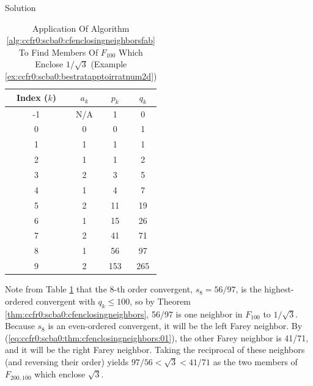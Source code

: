 \begin{vworkexampleparsection}{Solution}
\begin{table}
\caption{Application Of Algorithm \ref{alg:ccfr0:scba0:cfenclosingneighborsfab}
         To Find Members Of $F_{100}$ Which Enclose $1/\sqrt{3}$ 
		 (Example \ref{ex:ccfr0:scba0:bestratapptoirratnum2d})}
\label{tbl:ex:ccfr0:scba0:bestratapptoirratnum2d}
\begin{center}
\begin{tabular}{|c|c|c|c|}
\hline
\hspace{0.15in}\small{Index ($k$)}\hspace{0.15in} & \hspace{0.15in}\small{$a_k$}\hspace{0.15in}   &
 \hspace{0.15in}\small{$p_k$}\hspace{0.15in}    & \hspace{0.15in}\small{$q_k$}\hspace{0.15in}  \\
\hline
\hline
\small{-1}    & \small{N/A}     & \small{1}        & \small{0}      \\
\hline
\small{0}     & \small{0}       & \small{0}        & \small{1}      \\
\hline
\small{1}     & \small{1}       & \small{1}        & \small{1}      \\ 
\hline
\small{2}     & \small{1}       & \small{1}        & \small{2}      \\ 
\hline
\small{3}     & \small{2}       & \small{3}        & \small{5}      \\
\hline
\small{4}     & \small{1}       & \small{4}        & \small{7}      \\
\hline
\small{5}     & \small{2}       & \small{11}       & \small{19}     \\
\hline
\small{6}     & \small{1}       & \small{15}       & \small{26}     \\
\hline
\small{7}     & \small{2}       & \small{41}       & \small{71}     \\
\hline
\small{8}     & \small{1}       & \small{56}       & \small{97}     \\
\hline
\small{9}     & \small{2}       & \small{153}      & \small{265}    \\
\hline
\end{tabular}
\end{center}
\end{table}

Note from Table \ref{tbl:ex:ccfr0:scba0:bestratapptoirratnum2d}
that the 8-th order convergent, $s_8 = 56/97$,
is the highest-ordered convergent with $q_k \leq 100$, so 
by Theorem \ref{thm:ccfr0:scba0:cfenclosingneighbors}, 56/97
is one neighbor in $F_{100}$ to $1/\sqrt{3}$.  Because $s_8$
is an even-ordered convergent, it will be the left
Farey neighbor.
By (\ref{eq:ccfr0:scba0:thm:cfenclosingneighbors:01}), the
other Farey neighbor is 41/71, and it will be the right
Farey neighbor.  Taking the reciprocal of these neighbors (and
reversing their order) yields $97/56 < \sqrt{3} < 41/71$
as the two members of $F_{200, \overline{100}}$ which enclose
$\sqrt{3}$.
\end{vworkexampleparsection}
\vworkexamplefooter{}


